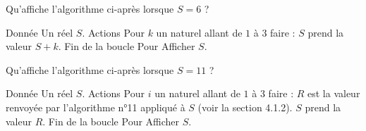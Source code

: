 \algorule

\begin{multicols}{2}
    \algoname{}
    Qu'affiche l'algorithme ci-après lorsque $S=6$ ?
    \bigskip
    \begin{myverb}
Donnée
    Un réel \(S\).
Actions
    Pour \(k\) un naturel allant de \(1\) à \(3\) faire :
        \(S\) prend la valeur \(S+k\).
    Fin de la boucle Pour
    Afficher \(S\).
    \end{myverb}

    \switchcol

    \algoname{}
    Qu'affiche l'algorithme ci-après lorsque $S=11$ ?
    \bigskip
    \begin{myverb}
Donnée
    Un réel \(S\).
Actions
    Pour \(i\) un naturel allant de \(1\) à \(3\) faire :
        \(R\) est la valeur renvoyée par l'algorithme
        n°11 appliqué à \(S\) (voir la section 4.1.2).
        \(S\) prend la valeur \(R\).
    Fin de la boucle Pour
    Afficher \(S\).
    \end{myverb}
\end{multicols}